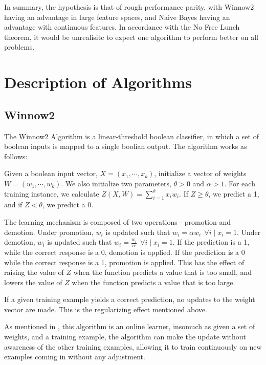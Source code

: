 \documentclass{amsart}
\begin{document}
    In summary, the hypothesis is that of rough performance parity, with Winnow2 having an advantage in large
    feature spaces, and Naive Bayes having an advantage with continuous features. In accordance with the
    No Free Lunch theorem, it would be unrealisitc to expect one algorithm to perform better on all problems.

    \section{Description of Algorithms}
    \subsection*{Winnow2}
    The Winnow2 Algorithm\cite{winnow2} is a linear-threshold boolean classifier, in which a set of boolean inputs is mapped
    to a single boolian output. The algorithm works as follows:

    Given a boolean input vector, $X = (x_1, \cdots, x_k)$,  initialize a vector of weights $W = (w_1, \cdots, w_k)$.
    We also initialize two parameters, $\theta > 0$  and $\alpha > 1$.
    For each training instance, we calculate $Z(X, W) = \sum_{i=1}^k x_i w_i$. If $Z \geq \theta$, we
    predict a 1, and if $Z < \theta$, we predict a 0.

    The learning mechanism is composed of two operations - promotion and demotion.
    Under promotion, $w_i$ is updated such that $w_i = \alpha w_i ~~\forall i \mid x_i = 1$. Under demotion,
    $w_i$ is updated such that $w_i =  \frac{w_i}{\alpha} ~~\forall i \mid x_i = 1$. If the prediction is a 1, while
    the correct response is a 0, demotion is applied. If the prediction is a 0 while the correct
    response is a 1, promotion is applied. This has the effect of raising the value of $Z$ when the
    function predicts a value that is too small, and lowers the value of $Z$ when the function predicts a value that is too large.

    If a given training example yields a correct prediction, no updates to the weight vector are made. This is the
    regularizing effect mentioned above.

    As mentioned in \cite{winnow2}, this algorithm is an online learner, insomuch as given a set of weights, and a training
    example, the algorithm can make the update without awareness of the other training examples, allowing it to train continuously on new examples coming in without
    any adjustment.
\end{document}

